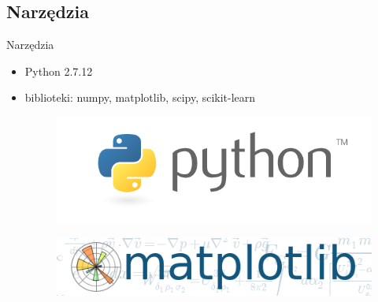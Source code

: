 \documentclass[xcolor=x11names,compress]{beamer}
\renewcommand{\(}{\begin{columns}}
\renewcommand{\)}{\end{columns}}
\newcommand{\<}[1]{\begin{column}{#1}}
\renewcommand{\>}{\end{column}}
\begin{document}
\subsection{Narzędzia}
\begin{frame}{Narzędzia}
	\begin{itemize}
		\item{Python 2.7.12} %

		\item{biblioteki: numpy, matplotlib, scipy, scikit-learn
				
                    \begin{figure}
                    \centering
                    \begin{minipage}{.3\textwidth}
                    \includegraphics[width=\linewidth]{python.png}
                    \label{fig:test1}
                    \end{minipage}\hfill
                    \begin{minipage}{.3\textwidth}
                    \includegraphics[width=\linewidth]{matplotlib.png}
                    \label{fig:test3}
                    \end{minipage}
                    \end{figure}			

}
\end{itemize}
\end{frame}
\end{document}
